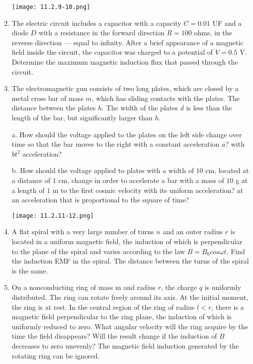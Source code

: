 \documentclass{article}
\begin{document}
\begin{enumerate}[label=11.2.\arabic*]
\begin{center}
    \texttt{[image: 11.2.9-10.png]}
\end{center}

\item The electric circuit includes a capacitor with a capacity $C = 0.01$ UF and a diode $D$ with a resistance in the forward direction $R = 100$ ohms, in the reverse direction — equal to infinity. After a brief appearance of a magnetic field inside the circuit, the capacitor was charged to a potential of $V = 0.5$ V. Determine the maximum magnetic induction flux that passed through the circuit.

\item The electromagnetic gun consists of two long plates, which are closed by a metal cross bar of mass $m$, which has sliding contacts with the plates. The distance between the plates $h$. The width of the plates $d$ is less than the length of the bar, but significantly larger than $h$.

a. How should the voltage applied to the plates on the left side change over time so that the bar moves to the right with a constant acceleration $a$? with $b t^2$ acceleration?

b. How should the voltage applied to plates with a width of $10$ cm, located at a distance of $1$ cm, change in order to accelerate a bar with a mass of $10$ g at a length of $1$ m to the first cosmic velocity with its uniform acceleration? at an acceleration that is proportional to the square of time?

\begin{center}
    \texttt{[image: 11.2.11-12.png]}
\end{center}

\item A flat spiral with a very large number of turns $n$ and an outer radius $r$ is located in a uniform magnetic field, the induction of which is perpendicular to the plane of the spiral and varies according to the law $B = B_0 cos \omega t$. Find the induction EMF in the spiral. The distance between the turns of the spiral is the same.

\item On a nonconducting ring of mass m and radius $r$, the charge $q$ is uniformly distributed. The ring can rotate freely around its axis. At the initial moment, the ring is at rest. In the central region of the ring of radius $l < r$, there is a magnetic field perpendicular to the ring plane, the induction of which is uniformly reduced to zero. What angular velocity will the ring acquire by the time the field disappears? Will the result change if the induction of $B$ decreases to zero unevenly? The magnetic field induction generated by the rotating ring can be ignored.


\end{enumerate}
\end{document}
